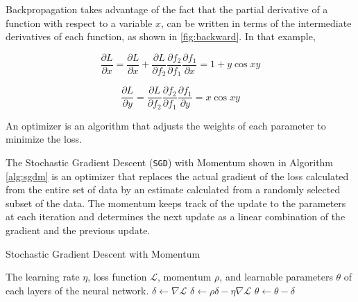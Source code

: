 Backpropagation takes advantage of the fact that the partial derivative of a function with respect to a variable $x$, can be written in terms of the intermediate derivatives of each function, as shown in \ref{fig:backward}. In that example, 

\begin{equation}
    \frac{\partial L}{\partial x} = \frac{\partial L}{\partial x} + \frac{\partial L}{\partial f_2} \frac{\partial f_2}{\partial f_1} \frac{\partial f_1}{\partial x} = 1 + y\cos{xy}
\end{equation}

\begin{equation}
    \frac{\partial L}{\partial y} =\frac{\partial L}{\partial f_2} \frac{\partial f_2}{\partial f_1} \frac{\partial f_1}{\partial y} = x\cos{xy}
\end{equation}

An optimizer is an algorithm that adjusts the weights of each parameter to minimize the loss.

The Stochastic Gradient Descent (\verb|SGD|) with Momentum shown in Algorithm \ref{alg:sgdm} is an optimizer that replaces the actual gradient of the loss calculated from the entire set of data by an estimate calculated from a randomly selected subset of the data. The momentum keeps track of the update to the parameters at each iteration and determines the next update as a linear combination of the gradient and the previous update.

\begin{algorithm}[htb]
\caption{Stochastic Gradient Descent with Momentum}
\label{alg:sgdm}
\begin{algorithmic}
    \Require The learning rate $\eta$, loss function $\mathcal{L}$, momentum $\rho$, and learnable parameters $\theta$ of each layers of the neural network.
    \State $\delta \gets \nabla \mathcal{L}$
        \State $\delta  \gets \rho \delta - \eta\nabla\mathcal{L}$ 
        \State $\theta \gets \theta - \delta $
    \EndFunction{}
\end{algorithmic}
\end{algorithm}


